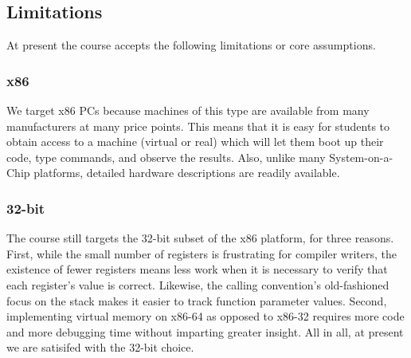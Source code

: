 
\subsection{Limitations}

At present the course accepts the following limitations
or core assumptions.

\subsubsection{x86}

We target x86 PCs because machines of this type are
available from many manufacturers at many price points.
This means that it is easy for students to obtain access
to a machine (virtual or real) which will let them boot
up their code, type commands, and observe the results.
Also, unlike many System-on-a-Chip platforms,
detailed hardware descriptions are readily available.

\subsubsection{32-bit}

The course still targets the 32-bit
subset of the x86 platform, for three reasons.
First, while the small number of registers is
frustrating for compiler writers,
the existence of fewer registers means less work
when it is necessary to verify that each register's
value is correct.
Likewise, the calling convention's old-fashioned focus on the stack
makes it easier to track function parameter values.
Second, implementing virtual memory on x86-64 as
opposed to x86-32 requires more code and more
debugging time without imparting greater insight.
All in all, at present we are satisifed with
the 32-bit choice.

